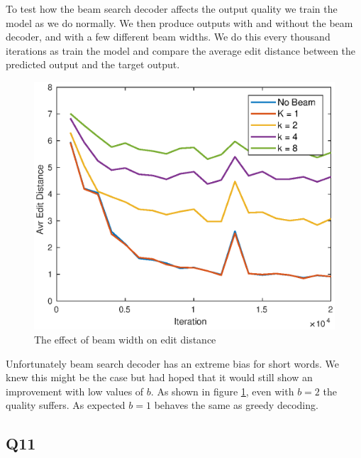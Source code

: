 \documentclass[12pt]{article}
\begin{document}
To test how the beam search decoder affects the output quality we train the model as we do normally. We then produce outputs with and without the beam decoder, and with a few different beam widths. We do this every thousand iterations as train the model and compare the average edit distance between the predicted output and the target output.

\begin{figure}[h]
    \centering
    \includegraphics[width=\linewidth]{img/beam_width2.eps}
    \caption{The effect of beam width on edit distance}
    \label{fig_beam_width}
\end{figure}

Unfortunately beam search decoder has an extreme bias for short words. We knew this might be the case but had hoped that it would still show an improvement with low values of $b$. As shown in figure \ref{fig_beam_width}, even with $b=2$ the quality suffers. As expected $b=1$ behaves the same as greedy decoding.

\subsection{Q11}
\textit{}
\end{document}
